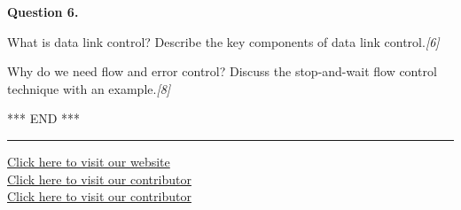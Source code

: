 \documentclass[11pt,a4paper]{article}
\newcommand{\pts}[1]{\hfill   \textit{[#1]}}
\begin{document}
\medskip


\noindent   \textbf{Question 6.}

\begin{parts}
  \item What is data link control? Describe the key components of data link control.\pts{6}
  \item Why do we need flow and error control? Discuss the stop-and-wait flow control technique with an example.\pts{8}
\end{parts}
\centerline{*** END ***}

\vfill
\rule{\linewidth}{0.4pt}

\begin{center}\small
\href{https://bhu-exam.vercel.app/}{Click here to visit our website}\\[4pt]\href{https://me-aryan.vercel.app/}{Click here to visit our contributor}\\[4pt]\href{https://quashan-me.vercel.app/}{Click here to visit our contributor}
\end{center}
\end{document}
